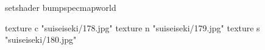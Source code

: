 setshader bumpspecmapworld

    texture c "suiseiseki/178.jpg"
    texture n "suiseiseki/179.jpg"
    texture s "suiseiseki/180.jpg"
